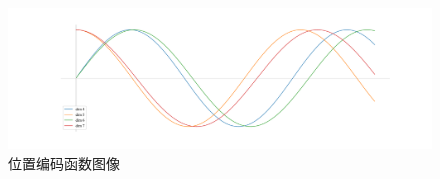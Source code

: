 \begin{figure}[htb]
	\centering
	\includegraphics[width=0.75\linewidth]{images/Positional Encoding.pdf}
	\caption{位置编码函数图像}
	\label{fig:PositionalEncoding}
\end{figure}